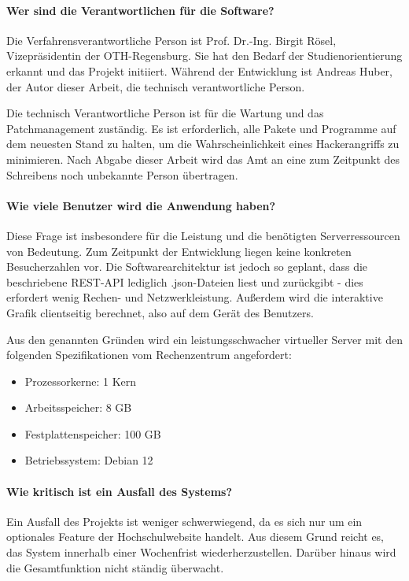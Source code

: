 \paragraph*{Wer sind die Verantwortlichen für die Software?}
Die Verfahrensverantwortliche Person ist Prof. Dr.-Ing. Birgit Rösel, Vizepräsidentin der OTH-Regensburg. Sie hat den Bedarf der Studienorientierung erkannt und das Projekt initiiert. Während der Entwicklung ist Andreas Huber, der Autor dieser Arbeit, die technisch verantwortliche Person.

Die technisch Verantwortliche Person ist für die Wartung und das Patchmanagement zuständig. Es ist erforderlich, alle Pakete und Programme auf dem neuesten Stand zu halten, um die Wahrscheinlichkeit eines Hackerangriffs zu minimieren. Nach Abgabe dieser Arbeit wird das Amt an eine zum Zeitpunkt des Schreibens noch unbekannte Person übertragen.

\paragraph*{Wie viele Benutzer wird die Anwendung haben?}
Diese Frage ist insbesondere für die Leistung und die benötigten Serverressourcen von Bedeutung. Zum Zeitpunkt der Entwicklung liegen keine konkreten Besucherzahlen vor. Die Softwarearchitektur ist jedoch so geplant, dass die beschriebene REST-API lediglich .json-Dateien liest und zurückgibt - dies erfordert wenig Rechen- und Netzwerkleistung. Außerdem wird die interaktive Grafik clientseitig berechnet, also auf dem Gerät des Benutzers.

Aus den genannten Gründen wird ein leistungsschwacher virtueller Server mit den folgenden Spezifikationen vom Rechenzentrum angefordert:
\begin{itemize}
    \item Prozessorkerne: 1 Kern
    \item Arbeitsspeicher: 8 GB
    \item Festplattenspeicher: 100 GB
    \item Betriebssystem: Debian 12
\end{itemize}

\paragraph*{Wie kritisch ist ein Ausfall des Systems?}
Ein Ausfall des Projekts ist weniger schwerwiegend, da es sich nur um ein optionales Feature der Hochschulwebsite handelt. Aus diesem Grund reicht es, das System innerhalb einer Wochenfrist wiederherzustellen. Darüber hinaus wird die Gesamtfunktion nicht ständig überwacht.

